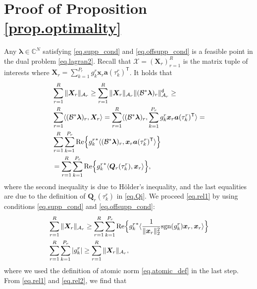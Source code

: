 \documentclass[conference,10pt]{IEEEtran}
\theoremstyle{remark}
\theoremstyle{plain}
\theoremstyle{definition}
\theoremstyle{remark}
\begin{document}
\appendix

\section{Proof of Proposition \ref{prop.optimality}}\label{proof.optimality}

Any $\bm{\lambda}\in\mathbb{C}^N$ satisfying \eqref{eq.supp_cond} and \eqref{eq.offsupp_cond} is a feasible point in the dual problem \eqref{eq.lagran2}. Recall that $\bm{\mathcal{X}}=(\bm{X}_r)_{r=1}^R$ is the matrix tuple of interests where $\bm{X}_r=\sum_{k=1}^{P_r}g_k^r\bm{x}_r\bm{a}(\tau_k^r)^{\mathsf{T}}$. It holds that
\begin{align}\label{eq.rel1}
&\sum_{r=1}^R\|\bm{X}_r\|_{\mathcal{A}_r}\ge \sum_{r=1}^R\|\bm{X}_r\|_{\mathcal{A}_r}\|(\mathcal{B}^*\bm{\lambda})_r\|_{\mathcal{A}_r}^{\mathsf{d}}\ge\nonumber\\
&\sum_{r=1}^R\langle (\mathcal{B}^*\bm{\lambda})_r, \bm{X}_r \rangle=\sum_{r=1}^R\langle (\mathcal{B}^*\bm{\lambda})_r, \sum_{k=1}^{P_r}g_k^r\bm{x}_r\bm{a}(\tau_k^r)^{\mathsf{T}} \rangle=\nonumber\\
&\sum_{r=1}^R\sum_{k=1}^{P_r}{\rm Re}\Big\{{g_k^r}^*\langle (\mathcal{B}^{\ast}\bm{\lambda})_r, \bm{x}_r\bm{a}(\tau_k^r)^{\mathsf{T}} \rangle \Big\} \nonumber\\
&=\sum_{r=1}^R\sum_{k=1}^{P_r}{\rm Re}\Big\{{g_k^r}^*\langle \bm{Q}_r(\tau_k^r), \bm{x}_r \rangle\Big\},
\end{align}
where the second inequality is due to H\"{o}lder's inequality, and the last equalities are due to the definition of $\bm{Q}_r(\tau_k^r)$ in \eqref{eq.Qi}. We proceed \eqref{eq.rel1} by using conditions \eqref{eq.supp_cond} and \eqref{eq.offsupp_cond}:
\begin{align}\label{eq.rel2}
&\sum_{r=1}^R\|\bm{X}_r\|_{\mathcal{A}_r}\ge \sum_{r=1}^R\sum_{k=1}^{P_r}{\rm Re}\Big\{{g_k^r}^*\langle \frac{1}{\|\bm{x}_r\|_2^2}{\rm sgn}(g_k^r)\bm{x}_r, \bm{x}_r \rangle\Big\}  \nonumber\\
&\sum_{r=1}^R\sum_{k=1}^{P_r}|g_k^r|\ge\sum_{r=1}^R\|\bm{X}_r\|_{\mathcal{A}_r},
\end{align}
where we used the definition of atomic norm \eqref{eq.atomic_def} in the last step. From \eqref{eq.rel1} and \eqref{eq.rel2}, we find that 
\end{document}
